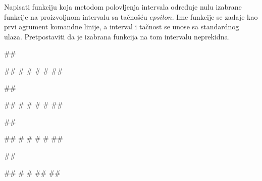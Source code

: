 \begin{Exercise}[label=3_07]
  Napisati funkciju koja metodom polovljenja intervala određuje nulu
  izabrane funkcije na proizvoljnom intervalu sa tačnošću
  $epsilon$. Ime funkcije se zadaje kao prvi agrument komandne
  linije, a interval i tačnost se unose sa standardnog
  ulaza. Pretpostaviti da je izabrana funkcija na tom intervalu
  neprekidna. 

\begin{miditest}
\begin{upotreba}{1}
##
  
#\naslovInt#
# #
# #
##
\end{upotreba}
\end{miditest}
\begin{miditest}
\begin{upotreba}{2}
##
  
#\naslovInt#
# #
# #
##
\end{upotreba}
\end{miditest}

\begin{miditest}
\begin{upotreba}{3}
##
      
#\naslovInt#
# #
# #
##
\end{upotreba}
\end{miditest}
\begin{miditest}
\begin{upotreba}{4}
##  

#\naslovInt#
# #
##
##
\end{upotreba}
\end{miditest}
  

\end{Exercise}

